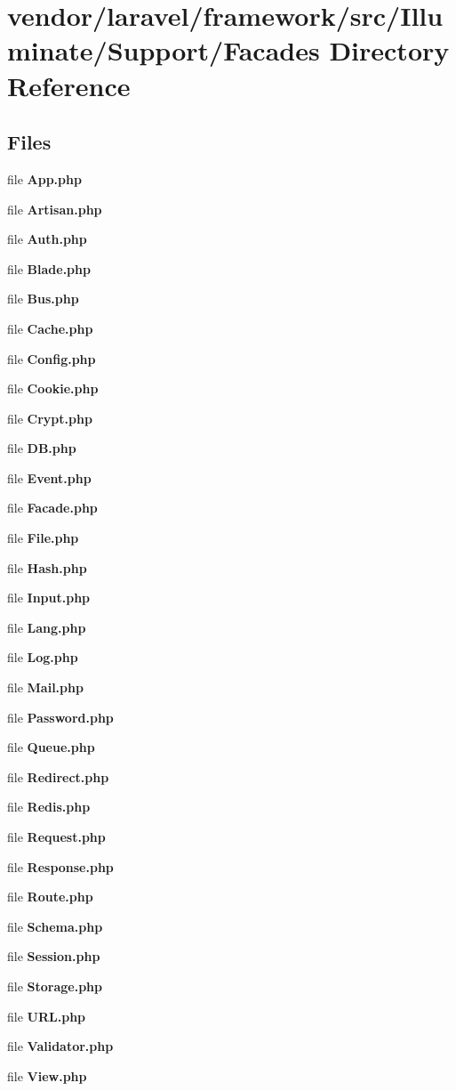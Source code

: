 \section{vendor/laravel/framework/src/\+Illuminate/\+Support/\+Facades Directory Reference}
\label{dir_89d216fd346fc02cdbb62e6977a2c277}
\subsection*{Files}
\begin{DoxyCompactItemize}
\item 
file {\bf App.\+php}
\item 
file {\bf Artisan.\+php}
\item 
file {\bf Auth.\+php}
\item 
file {\bf Blade.\+php}
\item 
file {\bf Bus.\+php}
\item 
file {\bf Cache.\+php}
\item 
file {\bf Config.\+php}
\item 
file {\bf Cookie.\+php}
\item 
file {\bf Crypt.\+php}
\item 
file {\bf D\+B.\+php}
\item 
file {\bf Event.\+php}
\item 
file {\bf Facade.\+php}
\item 
file {\bf File.\+php}
\item 
file {\bf Hash.\+php}
\item 
file {\bf Input.\+php}
\item 
file {\bf Lang.\+php}
\item 
file {\bf Log.\+php}
\item 
file {\bf Mail.\+php}
\item 
file {\bf Password.\+php}
\item 
file {\bf Queue.\+php}
\item 
file {\bf Redirect.\+php}
\item 
file {\bf Redis.\+php}
\item 
file {\bf Request.\+php}
\item 
file {\bf Response.\+php}
\item 
file {\bf Route.\+php}
\item 
file {\bf Schema.\+php}
\item 
file {\bf Session.\+php}
\item 
file {\bf Storage.\+php}
\item 
file {\bf U\+R\+L.\+php}
\item 
file {\bf Validator.\+php}
\item 
file {\bf View.\+php}
\end{DoxyCompactItemize}
